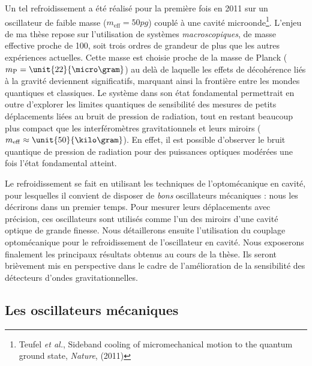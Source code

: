 \documentclass[12pt,a4paper]{article}
\begin{document}
Un tel refroidissement a été réalisé pour la première fois en 2011 sur un oscillateur de faible masse ($m_\mathrm{eff} = \unit{50}{pg}$) couplé à une cavité microonde\footnote{Teufel \textit{et al.}, Sideband cooling of micromechanical motion to the quantum ground state, \textit{Nature}, (2011)}.
L'enjeu de ma thèse repose sur l'utilisation de systèmes \emph{macroscopiques}, de masse effective proche de \unit{100}{\micro\gram}, soit trois ordres de grandeur de plus que les autres expériences actuelles.
Cette masse est choisie proche de la masse de Planck ($m_\mathrm{P}=\unit{22}{\micro\gram}$) au delà de laquelle les effets de décohérence liés à la gravité deviennent significatifs, marquant ainsi la frontière entre les \og mondes \fg{} quantiques et classiques. 
Le système dans son état fondamental permettrait en outre d'explorer les limites quantiques de sensibilité des mesures de petits déplacements liées au bruit de pression de radiation, tout en restant beaucoup plus compact que les interféromètres gravitationnels et leurs miroirs ($m_\mathrm{eff}\approx\unit{50}{\kilo\gram}$).
En effet, il est possible d'observer le bruit quantique de pression de radiation pour des puissances optiques modérées une fois l'état fondamental atteint.

Le refroidissement se fait en utilisant les techniques de l'optomécanique en cavité, pour lesquelles il convient de disposer de \textit{bons} oscillateurs mécaniques : nous les décrirons dans un premier temps.
Pour mesurer leurs déplacements avec précision, ces oscillateurs sont utilisés comme l'un des miroirs d'une cavité optique de grande finesse.
Nous détaillerons ensuite l'utilisation du couplage optomécanique pour le refroidissement de l'oscillateur en cavité.
Nous exposerons finalement les principaux résultats obtenus au cours de la thèse.
Ils seront brièvement mis en perspective dans le cadre de l'amélioration de la sensibilité des détecteurs d'ondes gravitationnelles.

\subsection{Les oscillateurs mécaniques}
\label{sec:mechanical_oscillators}
\end{document}
